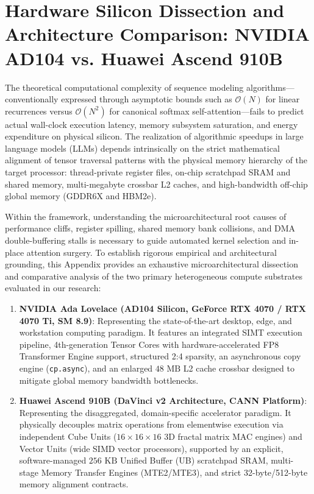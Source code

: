 
\section{Hardware Silicon Dissection and Architecture Comparison: NVIDIA AD104 vs. Huawei Ascend 910B}
\label{sec:appendix_silicon_dissection}

The theoretical computational complexity of sequence modeling algorithms---conventionally expressed through asymptotic bounds such as $\mathcal{O}(N)$ for linear recurrences versus $\mathcal{O}(N^2)$ for canonical softmax self-attention---fails to predict actual wall-clock execution latency, memory subsystem saturation, and energy expenditure on physical silicon. The realization of algorithmic speedups in large language models (LLMs) depends intrinsically on the strict mathematical alignment of tensor traversal patterns with the physical memory hierarchy of the target processor: thread-private register files, on-chip scratchpad SRAM and shared memory, multi-megabyte crossbar L2 caches, and high-bandwidth off-chip global memory (GDDR6X and HBM2e).

Within the \neuralops{} framework, understanding the microarchitectural root causes of performance cliffs, register spilling, shared memory bank collisions, and DMA double-buffering stalls is necessary to guide automated kernel selection and in-place attention surgery. To establish rigorous empirical and architectural grounding, this Appendix provides an exhaustive microarchitectural dissection and comparative analysis of the two primary heterogeneous compute substrates evaluated in our research:
\begin{enumerate}
    \item \textbf{NVIDIA Ada Lovelace (AD104 Silicon, GeForce RTX 4070 / RTX 4070 Ti, SM 8.9)}: Representing the state-of-the-art desktop, edge, and workstation computing paradigm. It features an integrated SIMT execution pipeline, 4th-generation Tensor Cores with hardware-accelerated FP8 Transformer Engine support, structured 2:4 sparsity, an asynchronous copy engine (\texttt{cp.async}), and an enlarged $48\text{ MB}$ L2 cache crossbar designed to mitigate global memory bandwidth bottlenecks.
    \item \textbf{Huawei Ascend 910B (DaVinci v2 Architecture, CANN Platform)}: Representing the disaggregated, domain-specific accelerator paradigm. It physically decouples matrix operations from elementwise execution via independent Cube Units ($16 \times 16 \times 16$ 3D fractal matrix MAC engines) and Vector Units (wide SIMD vector processors), supported by an explicit, software-managed $256\text{ KB}$ Unified Buffer (UB) scratchpad SRAM, multi-stage Memory Transfer Engines (MTE2/MTE3), and strict 32-byte/512-byte memory alignment contracts.
\end{enumerate}

